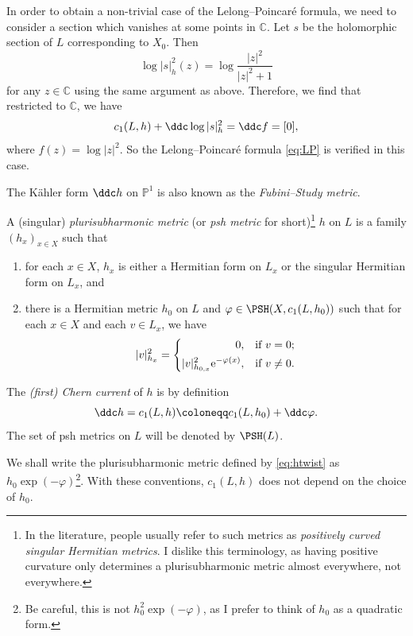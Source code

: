 \begin{example}
    In order to obtain a non-trivial case of the Lelong--Poincaré formula, we need to consider a section which vanishes at some points in $\mathbb{C}$. Let $s$ be the holomorphic section of $L$ corresponding to $X_0$. Then
    \[
    \log |s|_h^2(z)=\log \frac{|z|^2}{|z|^2+1}
    \]
    for any $z\in \mathbb{C}$ using the same argument as above. Therefore, we find that restricted to $\mathbb{C}$, we have
    \[
    c_1(L,h)+\ddc \log |s|_h^2=\ddc f=[0],
    \]
    where $f(z)=\log|z|^2$. So the Lelong--Poincaré formula \eqref{eq:LP} is verified in this case.

    The K\"ahler form $\ddc h$ on $\mathbb{P}^1$ is also known as the \emph{Fubini--Study metric}.
\end{example}


\begin{definition}\label{def:pshfunctions:L1836}
    A (singular) \emph{plurisubharmonic metric} (or \emph{psh metric} for short)\footnote{In the literature, people usually refer to such metrics as \emph{positively curved singular Hermitian metrics}. I dislike this terminology, as having positive curvature only determines a plurisubharmonic metric almost everywhere, not everywhere.} $h$ on $L$ is a family $(h_x)_{x\in X}$ such that
    \begin{enumerate}
        \item\label{itm:chapter-pshfunctions:L1857:1} for each $x\in X$, $h_x$ is either a Hermitian form on $L_x$ or the singular Hermitian form on $L_x$, and
        \item\label{itm:chapter-pshfunctions:L1857:2} there is a Hermitian metric $h_0$ on $L$ and $\varphi\in \PSH(X,c_1(L,h_0))$ such that for each $x\in X$ and each $v\in L_x$, we have
        \begin{equation}\label{eq:htwist}
        |v|^2_{h_x}=
        \left\{
        \begin{aligned}
            0,&\quad \textup{if }v=0;\\
            |v|^2_{h_{0,x}}\mathrm{e}^{-\varphi(x)},&\quad \textup{if }v\neq 0.
        \end{aligned}
        \right.
        \end{equation}
    \end{enumerate}
    The \emph{(first) Chern current} of $h$ is by definition
    \[
    \ddc h=c_1(L,h)\coloneqq c_1(L,h_0)+\ddc\varphi.
    \]
    The set of psh metrics on $L$ will be denoted by $\PSH(L)$.
\end{definition}
We shall write the plurisubharmonic metric defined by \eqref{eq:htwist} as $h_0\exp(-\varphi)$\footnote{Be careful, this is not $h_0^2\exp(-\varphi)$, as I prefer to think of $h_0$ as a quadratic form.}. With these conventions, $c_1(L,h)$ does not depend on the choice of $h_0$.

